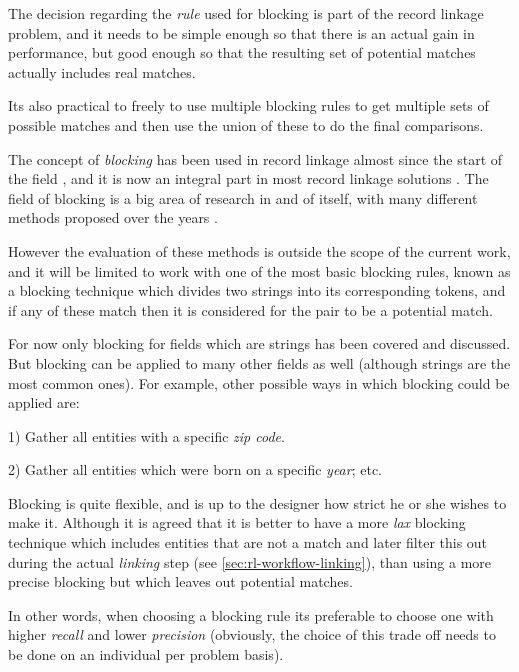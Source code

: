 \documentclass[epsfig,a4paper,11pt,titlepage,twoside,openany]{book}
\begin{document}
The decision regarding the \textit{rule} used for blocking is part of the record
linkage problem, and it needs to be simple enough so that there is an actual gain in performance, but good enough so that the resulting set of potential
matches actually includes real matches. 

Its also practical to freely to use multiple blocking
rules to get multiple sets of possible matches and then use the union of these
to do the final comparisons.

The concept of \textit{blocking} has been used in record linkage almost since
the start of the field \cite{fellegi69_theor_recor_linkag}, and it is now an
integral part in most record linkage solutions \cite{winkler2006overview}. The
field of blocking is a big area of research in and of itself, with many
different methods proposed over the years
\cite{christen12_survey_index_techn_scalab_recor_linkag_dedup, Baxter2003ACO}.

However the evaluation of these methods is outside the scope of the current
work, and it will be limited to work with one of the most basic blocking rules,
known as a blocking technique which divides two strings into its corresponding
tokens, and if any of these match then it is considered for the pair to be a potential match.

For now only blocking for fields which are strings has been covered and discussed. But
blocking can be applied to many other fields as well (although strings are the
most common ones). For example, other possible ways in which blocking could be applied are: 

1) Gather all entities with a specific \textit{zip code}. 

2) Gather all entities which were born on a specific \textit{year}; etc.

Blocking is quite flexible, and is up to the designer how strict he or she wishes to make it.
Although it is agreed
\cite{christen12_survey_index_techn_scalab_recor_linkag_dedup} that it is better
to have a more \textit{lax} blocking technique which includes entities that are
not a match and later filter this out during the actual \textit{linking} step
(see \autoref{sec:rl-workflow-linking}), than using a more precise blocking but
which leaves out potential matches. 

In other words, when choosing a blocking
rule its preferable to choose one with higher \textit{recall} and lower \textit{precision}
(obviously, the choice of this trade off needs to be done on an individual per problem
basis).
\end{document}
